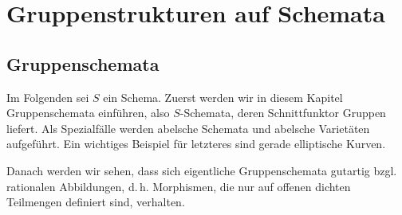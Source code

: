 \documentclass[german, bibliography=totoc]{scrreprt}
\begin{document}

\chapter{Gruppenstrukturen auf Schemata}
\label{chap:gruppenstrukturenaufschemata}
\section{Gruppenschemata}
Im Folgenden sei $S$ ein Schema.
Zuerst werden wir in diesem Kapitel Gruppenschemata einführen, also
$S$-Schemata, deren Schnittfunktor Gruppen liefert. Als Spezialfälle
werden abelsche Schemata und abelsche Varietäten aufgeführt. Ein
wichtiges Beispiel für letzteres sind gerade elliptische Kurven.

Danach werden wir sehen, dass sich eigentliche Gruppenschemata
gutartig bzgl. rationalen Abbildungen, d.\,h. Morphismen, die nur auf
offenen dichten Teilmengen definiert sind, verhalten.
\end{document}
